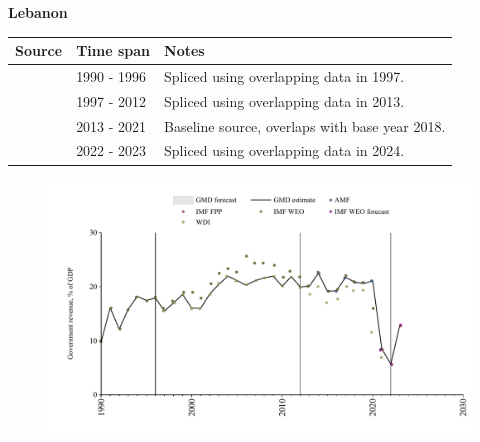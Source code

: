 \documentclass[12pt,a4paper,landscape]{article}
\begin{document}
\begin{adjustbox}{max totalsize={\paperwidth}{\paperheight},center}
\begin{minipage}[t][\textheight][t]{\textwidth}
\vspace*{0.5cm}
{}
\begin{center}
{\Large\bfseries Lebanon}
\end{center}
\vspace{0.5cm}
\begin{table}[H]
\centering
\small
\begin{tabular}{|l|l|l|}
\hline
\textbf{Source} & \textbf{Time span} & \textbf{Notes} \\
\hline
\rowcolor{white}\cite{IMF_WEO}& 1990 - 1996 &Spliced using overlapping data in 1997.\\
\rowcolor{lightgray}\cite{WDI}& 1997 - 2012 &Spliced using overlapping data in 2013.\\
\rowcolor{white}\cite{AMF}& 2013 - 2021 &Baseline source, overlaps with base year 2018.\\
\rowcolor{lightgray}\cite{IMF_FPP}& 2022 - 2023 &Spliced using overlapping data in 2024.\\
\hline
\end{tabular}
\end{table}
\begin{figure}[H]
\centering
\includegraphics[width=\textwidth,height=0.6\textheight,keepaspectratio]{graphs/LBN_govrev_GDP.pdf}
\end{figure}
\end{minipage}
\end{adjustbox}
\end{document}
